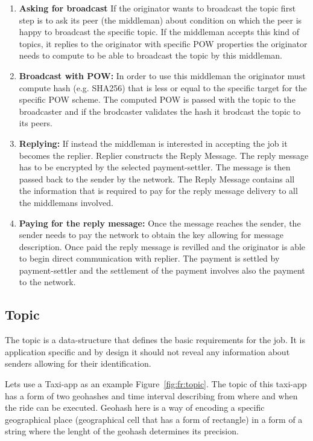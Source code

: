\documentclass{article}
\begin{document}
\begin{enumerate} 
	\item  \textbf{Asking for broadcast} If the originator wants to broadcast the topic first step is to ask its peer (the middleman) about condition on which the peer is happy to broadcast the specific topic. If the middleman accepts this kind of topics, it replies to the originator with specific POW properties the originator needs to compute to be able to broadcast the topic by this middleman.
	\item  \textbf{Broadcast with POW:} In order to use this middleman the originator must compute hash (e.g. SHA256) that is less or equal to the specific target for the specific POW scheme. The computed POW is passed with the topic to the broadcaster and if the brodcaster validates the hash it brodcast the topic to its peers.
	\item  \textbf{Replying:} If instead the middleman is interested in accepting the job it becomes the replier. Replier constructs the Reply Message. The reply message has to be encrypted by the selected payment-settler. The message is then passed back to the sender by the network. The Reply Message contains all the information that is required to pay for the reply message delivery to all the middlemans involved. 
	\item  \textbf{Paying for the reply message:} Once the message reaches the sender, the sender needs to pay the network to obtain the key allowing for message description. Once paid the reply message is revilled and the originator is able to begin direct communication with replier. The payment is settled by payment-settler and the settlement of the payment involves also the payment to the network.
\end{enumerate}

\subsection{Topic}

The topic is a data-structure that defines the basic requirements for the job. It is application specific and by design it should not reveal any information about senders allowing for their identification.

Lets use a Taxi-app as an example {Figure~\ref{fig:fr:topic}}. The topic of this taxi-app has a form of two geohashes and time interval describing from where and when the ride can be executed. Geohash here is a way of encoding a specific geographical place (geographical cell that has a form of rectangle) in a form of a string where the lenght of the geohash determines its precision.
\end{document}
